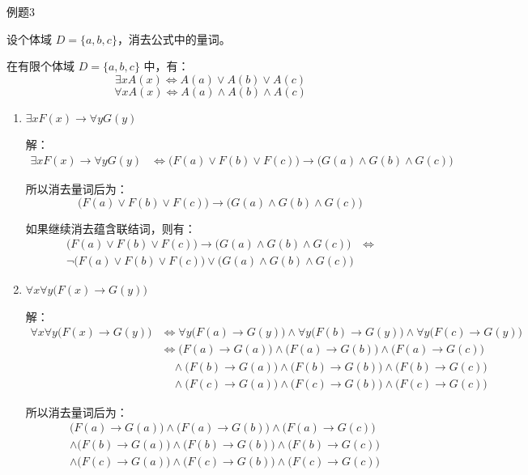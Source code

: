 \begin{question}{例题3}

设个体域 \(D=\{a,b,c\}\)，消去公式中的量词。

在有限个体域 \(D=\{a,b,c\}\) 中，有：
\[
\exists x A(x)\Leftrightarrow A(a)\lor A(b)\lor A(c)
\]
\[
\forall x A(x)\Leftrightarrow A(a)\land A(b)\land A(c)
\]

\begin{enumerate}
	\item \(\exists x F(x)\rightarrow \forall y G(y)\)
	
	解：
	\begin{align*}
		\exists x F(x)\rightarrow \forall y G(y)
		&\Leftrightarrow \bigl(F(a)\lor F(b)\lor F(c)\bigr)
		\rightarrow \bigl(G(a)\land G(b)\land G(c)\bigr)
	\end{align*}
	
	所以消去量词后为：
	\[
	\boxed{
		\bigl(F(a)\lor F(b)\lor F(c)\bigr)
		\rightarrow
		\bigl(G(a)\land G(b)\land G(c)\bigr)
	}
	\]
	
	如果继续消去蕴含联结词，则有：
	\begin{align*}
		\bigl(F(a)\lor F(b)\lor F(c)\bigr)
		\rightarrow 
		\bigl(G(a)\land G(b)\land G(c)\bigr) 
		&\Leftrightarrow \\
		\neg\bigl(F(a)\lor F(b)\lor F(c)\bigr)
		\lor
		\bigl(G(a)\land G(b)\land G(c)\bigr)
	\end{align*}
	
	\item \(\forall x \forall y \bigl(F(x)\rightarrow G(y)\bigr)\)
	
	解：
	\begin{align*}
		\forall x \forall y \bigl(F(x)\rightarrow G(y)\bigr)
		&\Leftrightarrow
		\forall y \bigl(F(a)\rightarrow G(y)\bigr)
		\land
		\forall y \bigl(F(b)\rightarrow G(y)\bigr)
		\land
		\forall y \bigl(F(c)\rightarrow G(y)\bigr) \\
		&\Leftrightarrow
		\bigl(F(a)\rightarrow G(a)\bigr)
		\land
		\bigl(F(a)\rightarrow G(b)\bigr)
		\land
		\bigl(F(a)\rightarrow G(c)\bigr) \\
		&\quad \land
		\bigl(F(b)\rightarrow G(a)\bigr)
		\land
		\bigl(F(b)\rightarrow G(b)\bigr)
		\land
		\bigl(F(b)\rightarrow G(c)\bigr) \\
		&\quad \land
		\bigl(F(c)\rightarrow G(a)\bigr)
		\land
		\bigl(F(c)\rightarrow G(b)\bigr)
		\land
		\bigl(F(c)\rightarrow G(c)\bigr)
	\end{align*}
	
	所以消去量词后为：
	\[
	\boxed{
		\begin{aligned}
			&\bigl(F(a)\rightarrow G(a)\bigr)
			\land
			\bigl(F(a)\rightarrow G(b)\bigr)
			\land
			\bigl(F(a)\rightarrow G(c)\bigr) \\
			&\land
			\bigl(F(b)\rightarrow G(a)\bigr)
			\land
			\bigl(F(b)\rightarrow G(b)\bigr)
			\land
			\bigl(F(b)\rightarrow G(c)\bigr) \\
			&\land
			\bigl(F(c)\rightarrow G(a)\bigr)
			\land
			\bigl(F(c)\rightarrow G(b)\bigr)
			\land
			\bigl(F(c)\rightarrow G(c)\bigr)
		\end{aligned}
	}
	\]
	

\end{enumerate}
\end{question}

